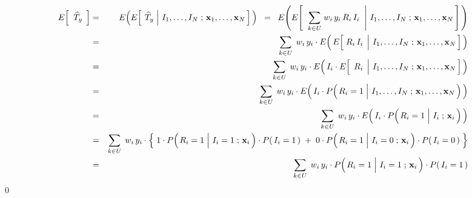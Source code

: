 \begin{eqnarray*}
E\!\left[\;\;\widehat{T}_{y}\;\,\right]
& = &
	E\!\left(E\!\left[\;
		\left.\widehat{T}_{y}\;\right\vert\,I_{1},\ldots,I_{N}
		\;;\,\mathbf{x}_{1},\ldots,\mathbf{x}_{N}
		\,\right]\,\right)
\;\; = \;\;
	E\!\left(E\!\left[\;\,
		\left.\underset{k \in U}{\sum}\;w_{i}\,y_{i}\,R_{i}\,I_{i}\;\;\right\vert\,I_{1},\ldots,I_{N}
		\;;\,\mathbf{x}_{1},\ldots,\mathbf{x}_{N}
		\,\right]\,\right)
\\
& = &
	\underset{k \in U}{\sum}\;\,w_{i}\,y_{i}
	\cdot
	E\!\left(\,E\!\left[\,
		\left.\overset{{\color{white}.}}{R_{i}\,I_{i}}\;\,\right\vert\,I_{1},\ldots,I_{N}
		\;;\,\mathbf{x}_{1},\ldots,\mathbf{x}_{N}
		\,\right]\,\right)
\\
& = &
	\underset{k \in U}{\sum}\;\,w_{i}\,y_{i}
	\cdot
	E\!\left(\,I_{i} \cdot E\!\left[\,
		\left.\,\overset{{\color{white}.}}{R_{i}}\;\,\right\vert\,I_{1},\ldots,I_{N}
		\;;\,\mathbf{x}_{1},\ldots,\mathbf{x}_{N}
		\,\right]\,\right)
\\
& = &
	\underset{k \in U}{\sum}\;\,w_{i}\,y_{i}
	\cdot
	E\!\left(\,I_{i} \cdot P\!\left(
		\left.\overset{{\color{white}.}}{R_{i}}=1\;\right\vert\,I_{1},\ldots,I_{N}
		\;;\,\mathbf{x}_{1},\ldots,\mathbf{x}_{N}
		\,\right)\,\right)
\\
& = &
	\underset{k \in U}{\sum}\;\,w_{i}\,y_{i}
	\cdot
	E\!\left(\,I_{i} \cdot P\!\left(
		\left.\overset{{\color{white}.}}{R_{i}}=1\;\right\vert\,I_{i}
		\;;\,\mathbf{x}_{i}
		\,\right)\,\right)
\\
& = &
	\underset{k \in U}{\sum}\;\,w_{i}\,y_{i}
	\cdot
	\left\{\;
		1 \cdot P\!\left(\left.
			\overset{{\color{white}.}}{R_{i}}=1\;\right\vert\,I_{i}=1
			\;;\,\mathbf{x}_{i}
			\,\right) \cdot P(\,I_{i}=1\,)
		\; + \;
		0 \cdot P\!\left(\left.
			\overset{{\color{white}.}}{R_{i}}=1\;\right\vert\,I_{i}=0
			\;;\,\mathbf{x}_{i}
			\,\right) \cdot P(\,I_{i}=0\,)
		\;\right\}
\\
& = &
	\underset{k \in U}{\sum}\;\,w_{i}\,y_{i}
	\cdot P\!\left(\left.\overset{{\color{white}.}}{R_{i}}=1\;\right\vert\,I_{i}=1\;;\,\mathbf{x}_{i}\,\right) \cdot P(\,I_{i}=1\,)
\end{eqnarray*}
\qed

